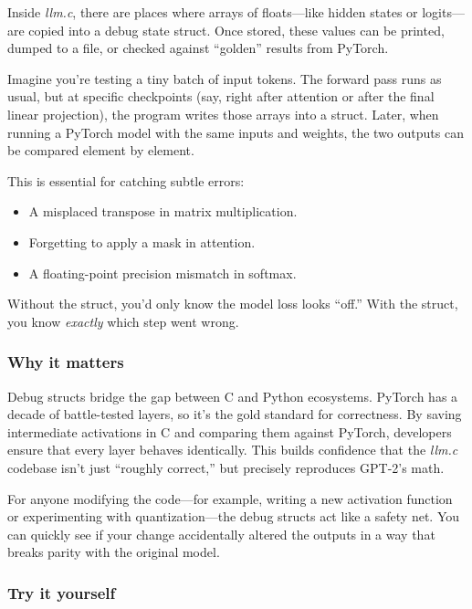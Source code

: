 \documentclass[
  letterpaper,
  DIV=11,
  numbers=noendperiod]{scrreprt}
\providecommand{\tightlist}{%
  \setlength{\itemsep}{0pt}\setlength{\parskip}{0pt}}
\begin{document}
Inside \emph{llm.c}, there are places where arrays of floats---like
hidden states or logits---are copied into a debug state struct. Once
stored, these values can be printed, dumped to a file, or checked
against ``golden'' results from PyTorch.

Imagine you're testing a tiny batch of input tokens. The forward pass
runs as usual, but at specific checkpoints (say, right after attention
or after the final linear projection), the program writes those arrays
into a struct. Later, when running a PyTorch model with the same inputs
and weights, the two outputs can be compared element by element.

This is essential for catching subtle errors:

\begin{itemize}
\tightlist
\item
  A misplaced transpose in matrix multiplication.
\item
  Forgetting to apply a mask in attention.
\item
  A floating-point precision mismatch in softmax.
\end{itemize}

Without the struct, you'd only know the model loss looks ``off.'' With
the struct, you know \emph{exactly} which step went wrong.

\subsubsection{Why it matters}\label{why-it-matters-31}

Debug structs bridge the gap between C and Python ecosystems. PyTorch
has a decade of battle-tested layers, so it's the gold standard for
correctness. By saving intermediate activations in C and comparing them
against PyTorch, developers ensure that every layer behaves identically.
This builds confidence that the \emph{llm.c} codebase isn't just
``roughly correct,'' but precisely reproduces GPT-2's math.

For anyone modifying the code---for example, writing a new activation
function or experimenting with quantization---the debug structs act like
a safety net. You can quickly see if your change accidentally altered
the outputs in a way that breaks parity with the original model.

\subsubsection{Try it yourself}\label{try-it-yourself-39}
\end{document}
